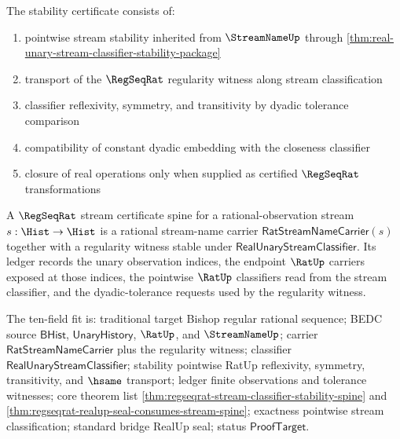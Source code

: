 \begin{definition}
\label{def:real-stability-certificate}
The stability certificate consists of:
\begin{enumerate}
  \item pointwise stream stability inherited from $\StreamNameUp$ through
  \autoref{thm:real-unary-stream-classifier-stability-package}
  \item transport of the $\RegSeqRat$ regularity witness along stream classification
  \item classifier reflexivity, symmetry, and transitivity by dyadic tolerance comparison
  \item compatibility of constant dyadic embedding with the closeness classifier
  \item closure of real operations only when supplied as certified $\RegSeqRat$ transformations
\end{enumerate}
\end{definition}

\begin{definition}
\label{def:regseqrat-stream-certificate-spine}
A $\RegSeqRat$ stream certificate spine for a rational-observation stream
$s:\Hist\to\Hist$ is a rational stream-name carrier
$\mathsf{RatStreamNameCarrier}(s)$ together with a regularity witness stable
under $\mathsf{RealUnaryStreamClassifier}$. Its ledger records the unary
observation indices, the endpoint $\RatUp$ carriers exposed at those indices,
the pointwise $\RatUp$ classifiers read from the stream classifier, and the
dyadic-tolerance requests used by the regularity witness.

The ten-field fit is: traditional target Bishop regular rational sequence;
BEDC source $\mathsf{BHist}$, $\mathsf{UnaryHistory}$, $\RatUp$, and
$\StreamNameUp$; carrier $\mathsf{RatStreamNameCarrier}$ plus the regularity
witness; classifier $\mathsf{RealUnaryStreamClassifier}$; stability pointwise
RatUp reflexivity, symmetry, transitivity, and $\hsame$ transport; ledger
finite observations and tolerance witnesses; core theorem list
\autoref{thm:regseqrat-stream-classifier-stability-spine} and
\autoref{thm:regseqrat-realup-seal-consumes-stream-spine}; exactness pointwise
stream classification; standard bridge RealUp seal; status
$\mathsf{ProofTarget}$.
\end{definition}

